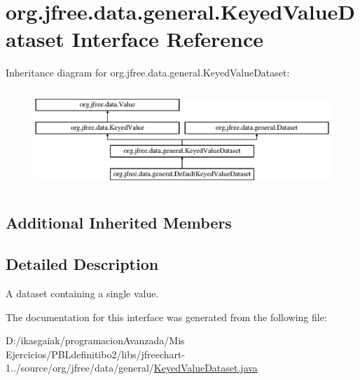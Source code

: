 \hypertarget{interfaceorg_1_1jfree_1_1data_1_1general_1_1_keyed_value_dataset}{}\section{org.\+jfree.\+data.\+general.\+Keyed\+Value\+Dataset Interface Reference}
\label{interfaceorg_1_1jfree_1_1data_1_1general_1_1_keyed_value_dataset}
Inheritance diagram for org.\+jfree.\+data.\+general.\+Keyed\+Value\+Dataset\+:\begin{figure}[H]
\begin{center}
\leavevmode
\includegraphics[height=3.745819cm]{interfaceorg_1_1jfree_1_1data_1_1general_1_1_keyed_value_dataset}
\end{center}
\end{figure}
\subsection*{Additional Inherited Members}


\subsection{Detailed Description}
A dataset containing a single value. 

The documentation for this interface was generated from the following file\+:\begin{DoxyCompactItemize}
\item 
D\+:/ikasgaiak/programacion\+Avanzada/\+Mis Ejercicios/\+P\+B\+Ldefinitibo2/libs/jfreechart-\/1../source/org/jfree/data/general/\mbox{\hyperlink{_keyed_value_dataset_8java}{Keyed\+Value\+Dataset.\+java}}\end{DoxyCompactItemize}
